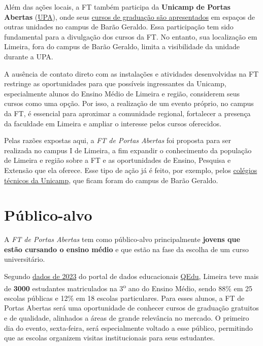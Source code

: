 \documentclass[
  letterpaper,
  DIV=11,
  numbers=noendperiod]{scrreprt}
\begin{document}
Além das ações locais, a FT também participa da \textbf{Unicamp de
Portas Abertas} (\href{https://upa.unicamp.br/}{UPA}), onde seus
\href{https://wordpress.ft.unicamp.br/upa/}{cursos de graduação são
apresentados} em espaços de outras unidades no campus de Barão Geraldo.
Essa participação tem sido fundamental para a divulgação dos cursos da
FT. No entanto, sua localização em Limeira, fora do campus de Barão
Geraldo, limita a visibilidade da unidade durante a UPA.

A ausência de contato direto com as instalações e atividades
desenvolvidas na FT restringe as oportunidades para que possíveis
ingressantes da Unicamp, especialmente alunos do Ensino Médio de Limeira
e região, considerem seus cursos como uma opção. Por isso, a realização
de um evento próprio, no campus da FT, é essencial para aproximar a
comunidade regional, fortalecer a presença da faculdade em Limeira e
ampliar o interesse pelos cursos oferecidos.

Pelas razões expostas aqui, a \emph{FT de Portas Abertas} foi proposta
para ser realizada no campus I de Limeira, a fim expandir o conhecimento
da população de Limeira e região sobre a FT e as oportunidades de
Ensino, Pesquisa e Extensão que ela oferece. Esse tipo de ação já é
feito, por exemplo, pelos
\href{https://unicamp.br/noticias/2024/07/24/colegios-tecnicos-da-unicamp-abrem-portas-para-novos-estudantes/}{colégios
técnicos da Unicamp}, que ficam foram do campus de Barão Geraldo.

\section{Público-alvo}\label{puxfablico-alvo}

A \emph{FT de Portas Abertas} tem como público-alvo principalmente
\textbf{jovens que estão cursando o ensino médio} e que estão na fase da
escolha de um curso universitário.

Segundo
\href{https://qedu.org.br/municipio/3526902-limeira/censo-escolar}{dados
de 2023} do portal de dados educacionais
\href{https://qedu.org.br/}{QEdu}, Limeira teve mais de \textbf{3000}
estudantes matriculados na 3\textsuperscript{o} ano do Ensino Médio,
sendo 88\% em 25 escolas públicas e 12\% em 18 escolas particulares.
Para esses alunos, a FT de Portas Abertas será uma oportunidade de
conhecer cursos de graduação gratuitos e de qualidade, alinhados a áreas
de grande relevância no mercado. O primeiro dia do evento, sexta-feira,
será especialmente voltado a esse público, permitindo que as escolas
organizem visitas institucionais para seus estudantes.
\end{document}
